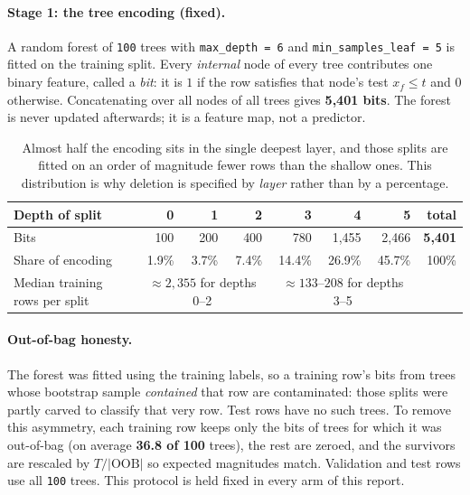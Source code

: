 \documentclass[11pt,a4paper]{article}
\newcommand{\num}[1]{\texttt{#1}}
\begin{document}
\paragraph{Stage 1: the tree encoding (fixed).}
A random forest of \num{100} trees with \num{max\_depth = 6} and
\num{min\_samples\_leaf = 5} is fitted on the training split. Every
\emph{internal} node of every tree contributes one binary feature, called a
\emph{bit}: it is $1$ if the row satisfies that node's test $x_f \le t$ and $0$
otherwise. Concatenating over all nodes of all trees gives \textbf{5{,}401
bits}. The forest is never updated afterwards; it is a feature map, not a
predictor.

\begin{table}[h]\centering\small
\begin{tabular}{lrrrrrrr}
\toprule
\textbf{Depth of split} & 0 & 1 & 2 & 3 & 4 & 5 & \textbf{total}\\
\midrule
Bits & 100 & 200 & 400 & 780 & 1{,}455 & 2{,}466 & \textbf{5{,}401}\\
Share of encoding & 1.9\% & 3.7\% & 7.4\% & 14.4\% & 26.9\% & 45.7\% & 100\%\\
Median training rows per split & \multicolumn{3}{c}{$\approx 2{,}355$ for depths 0--2}
  & \multicolumn{3}{c}{$\approx 133$--$208$ for depths 3--5} & \\
\bottomrule
\end{tabular}
\caption{Almost half the encoding sits in the single deepest layer, and those
splits are fitted on an order of magnitude fewer rows than the shallow ones.
This distribution is why deletion is specified by \emph{layer} rather than by a
percentage.}
\end{table}

\paragraph{Out-of-bag honesty.}
The forest was fitted using the training labels, so a training row's bits from
trees whose bootstrap sample \emph{contained} that row are contaminated: those
splits were partly carved to classify that very row. Test rows have no such
trees. To remove this asymmetry, each training row keeps only the bits of trees
for which it was out-of-bag (on average \textbf{36.8 of 100} trees), the rest
are zeroed, and the survivors are rescaled by $T/|\mathrm{OOB}|$ so expected
magnitudes match. Validation and test rows use all \num{100} trees. This
protocol is held fixed in every arm of this report.
\end{document}

